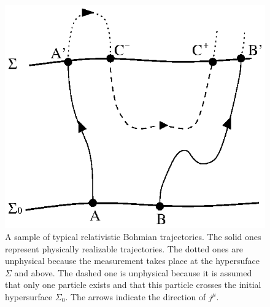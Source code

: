\documentclass[11pt]{article}
\begin{document}
\begin{figure}[t]
\centerline{\includegraphics{traj2.ps}}
\caption{A sample of typical relativistic Bohmian trajectories.
The solid ones represent physically realizable trajectories. 
The dotted ones are unphysical because the measurement takes place 
at the hypersuface $\Sigma$ and above. The dashed one is unphysical 
because it is assumed that only one particle exists and that 
this particle crosses the initial hypersurface $\Sigma_0$.
The arrows indicate the direction of $j^{\mu}$.}
\label{fig1}
\end{figure}
\end{document}
